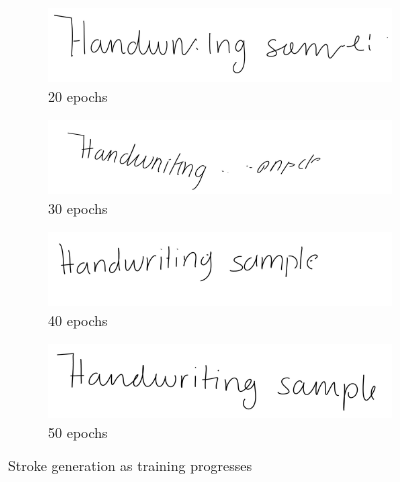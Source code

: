 \documentclass{article}
\begin{document}
\begin{figure}[hbt!]
     \begin{subfigure}[b]{0.49\textwidth}
         \centering
         \includegraphics[width=\textwidth]{gen_stroke_samples_200}
         \caption{20 epochs}
         \label{fig:training_strokes:c}
     \end{subfigure}
     \hfill
     \begin{subfigure}[b]{0.49\textwidth}
         \centering
         \includegraphics[width=\textwidth]{gen_stroke_samples_300}
         \caption{30 epochs}
         \label{fig:training_strokes:d}
     \end{subfigure}
     \newline
     
     \begin{subfigure}{0.49\textwidth}
         \centering
         \includegraphics[width=\textwidth]{gen_stroke_samples_400}
         \caption{40 epochs}
         \label{fig:training_strokes:e}
     \end{subfigure}
     \hfill
     \begin{subfigure}{0.49\textwidth}
         \centering
         \includegraphics[width=\textwidth]{gen_stroke_samples_505}
         \caption{50 epochs}
         \label{fig:training_strokes:f}
     \end{subfigure}
     
    \caption{Stroke generation as training progresses}
    \label{fig:training_strokes}
\end{figure}
\end{document}
